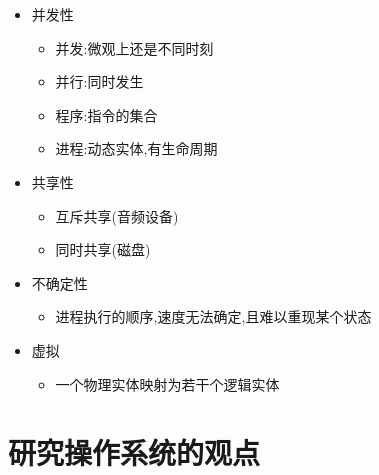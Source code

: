 \documentclass[a4paper,10pt,notitlepage]{article}
\begin{document}
\begin{itemize}
	
	\item 并发性
	\begin{itemize}
		\item 并发:微观上还是不同时刻
		\item 并行:同时发生
		\item 程序:指令的集合
		\item 进程:动态实体,有生命周期
	\end{itemize}
	
	\item 共享性
	\begin{itemize}
		\item 互斥共享(音频设备)
		\item 同时共享(磁盘)
	\end{itemize}
	
	\item 不确定性
	\begin{itemize}
		\item 进程执行的顺序,速度无法确定,且难以重现某个状态
	\end{itemize}
	
	\item 虚拟
	\begin{itemize}
		\item 一个物理实体映射为若干个逻辑实体
	\end{itemize}
\end{itemize}

\section{研究操作系统的观点}
\end{document}
